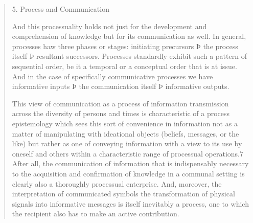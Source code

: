 \documentclass[a4paper]{Thesis}
\begin{document}
	\begin{quotation}
		5. Process and Communication
		
		And this processuality holds not just for the development and comprehension of
		knowledge but for its communication as well. In general, processes haw three phases or
		stages:
		initiating precursors Þ the process itself Þ resultant successors.
		Processes standardly exhibit such a pattern of sequential order, be it a temporal or a
		conceptual order that is at issue. And in the case of specifically communicative processes
		we have
		informative inputs Þ the communication itself Þ informative outputs.
		
		This view of communication as a process of information transmission across the diversity
		of persons and times is characteristic of a process epistemology which sees this sort of
		convenience in information not as a matter of manipulating with ideational objects
		(beliefs, messages, or the like) but rather as one of conveying information with a view to
		its use by oneself and others within a characteristic range of processual operations.7 After
		all, the communication of information that is indispensably necessary to the acquisition
		and confirmation of knowledge in a communal setting is clearly also a thoroughly
		processual enterprise. And, moreover, the interpretation of communicated symbols the
		transformation of physical signals into informative messages is itself inevitably a process,
		one to which the recipient also has to make an active contribution.	
	\end{quotation}
	
\end{document}
